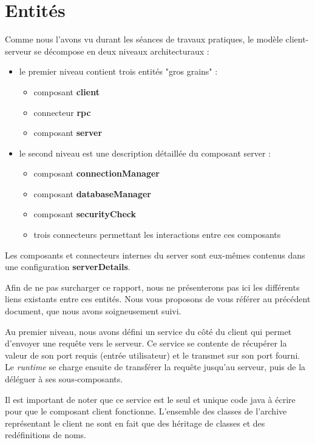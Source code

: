     \section{Entités}
    	Comme nous l'avons vu durant les séances de travaux pratiques, le modèle client-serveur se décompose en deux niveaux architecturaux : 
        \begin{itemize}
        	\item le premier niveau contient trois entités "gros grains" :
            \begin{itemize}
            	\item composant \textbf{client}
                \item connecteur \textbf{rpc}
                \item composant \textbf{server}
            \end{itemize}
            \item le second niveau est une description détaillée du composant server :
            \begin{itemize}
            	\item composant \textbf{connectionManager}
                \item composant \textbf{databaseManager}
                \item composant \textbf{securityCheck}
                \item trois connecteurs permettant les interactions entre ces composants
			\end{itemize}
		\end{itemize}
        Les composants et connecteurs internes du server sont eux-mêmes contenus dans une configuration \textbf{serverDetails}.
        \newline
        
        Afin de ne pas surcharger ce rapport, nous ne présenterons pas ici les différents liens existants entre ces entités. Nous vous proposons de vous référer au précédent document, que nous avons soigneusement suivi.
        \newline
        
        Au premier niveau, nous avons défini un service du côté du client qui permet d'envoyer une requête vers le serveur. Ce service se contente de récupérer la valeur de son port requis (entrée utilisateur) et le transmet sur son port fourni. Le \emph{runtime} se charge ensuite de transférer la requête jusqu'au serveur, puis de la déléguer à ses sous-composants.


		Il est important de noter que ce service est le seul et unique code java à écrire pour que le composant client fonctionne. L'ensemble des classes de l'archive représentant le client ne sont en fait que des héritage de classes et des redéfinitions de noms.
        \newline
        
